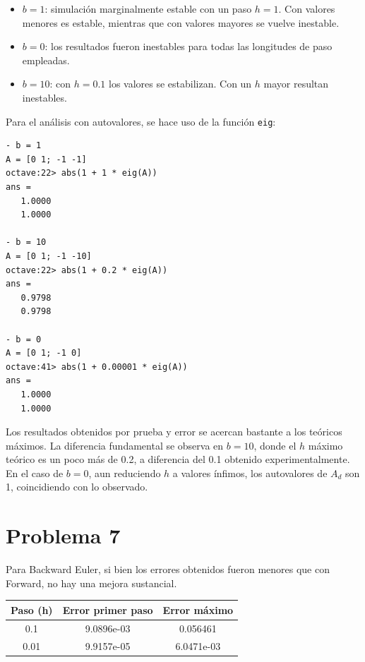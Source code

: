 \documentclass[a4paper,12pt]{article}
\begin{document}
\begin{itemize}
    \item \( b = 1 \): simulación marginalmente estable con un paso \( h = 1 \). Con valores menores es estable, mientras que con valores mayores se vuelve inestable.
    \item \( b = 0 \): los resultados fueron inestables para todas las longitudes de paso empleadas.
    \item \( b = 10 \): con \( h = 0.1 \) los valores se estabilizan. Con un \( h \) mayor resultan inestables.
\end{itemize}

Para el análisis con autovalores, se hace uso de la función \texttt{eig}:

\begin{verbatim}
- b = 1
A = [0 1; -1 -1]
octave:22> abs(1 + 1 * eig(A))
ans =
   1.0000
   1.0000

- b = 10
A = [0 1; -1 -10]
octave:22> abs(1 + 0.2 * eig(A))
ans =
   0.9798
   0.9798

- b = 0
A = [0 1; -1 0]
octave:41> abs(1 + 0.00001 * eig(A))
ans =
   1.0000
   1.0000
\end{verbatim}

Los resultados obtenidos por prueba y error se acercan bastante a los teóricos máximos. La diferencia fundamental se observa en \( b = 10 \), donde el \( h \) máximo teórico es un poco más de 0.2, a diferencia del 0.1 obtenido experimentalmente. En el caso de \( b = 0 \), aun reduciendo \( h \) a valores ínfimos, los autovalores de \( A_d \) son 1, coincidiendo con lo observado.

\section*{Problema 7}

Para Backward Euler, si bien los errores obtenidos fueron menores que con Forward, no hay una mejora sustancial.

\begin{table}[H]
\centering
\begin{tabular}{@{}ccc@{}}
\toprule
Paso (h) & Error primer paso & Error máximo \\
\midrule
0.1 & 9.0896e-03 & 0.056461 \\
0.01 & 9.9157e-05 & 6.0471e-03 \\
\bottomrule
\end{tabular}
\end{table}
\end{document}
